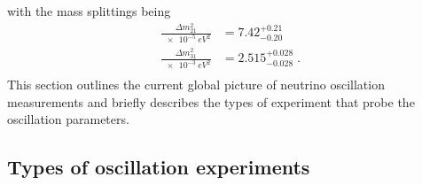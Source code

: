 with the mass splittings being
\begin{equation}
    \begin{aligned}
        \frac{\Delta m^2_{21}}{\SI{e-5}{eV^2}} &= 7.42^{+0.21}_{-0.20} \\
        \frac{\Delta m^2_{31}}{\SI{e-3}{eV^2}} &= 2.515^{+0.028}_{-0.028}\;. \\
    \end{aligned}
\end{equation}
This section outlines the current global picture of neutrino oscillation measurements and briefly describes the types of experiment that probe the oscillation parameters.

\subsection{Types of oscillation experiments}

